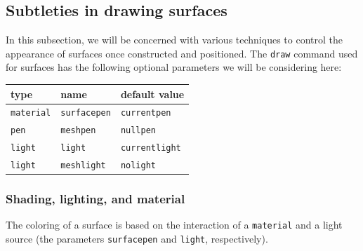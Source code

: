 \documentclass{article}
\begin{document}
\subsection{Subtleties in drawing surfaces}
In this subsection, we will be concerned with various techniques 
to control the appearance of surfaces once 
constructed and positioned.  
The \lstinline!draw! command used for surfaces has the following optional
parameters we will be considering here:
\begin{center}
\begin{tabular}{@{} l l l @{}}						\toprule
type			& name			& default value		\\ \midrule
\lstinline!material! & \lstinline!surfacepen! & \lstinline!currentpen! \\
\lstinline!pen! & \lstinline!meshpen! & \lstinline!nullpen! \\
\lstinline!light! & \lstinline!light! & \lstinline!currentlight! \\
\lstinline!light! & \lstinline!meshlight! & \lstinline!nolight! \\
\bottomrule
\end{tabular}
\end{center}
%
\subsubsection{Shading, lighting, and material}\label{sectionlike:material}
%
The coloring of a surface is based on the interaction of a \lstinline!material! and
a light source (the parameters \lstinline!surfacepen! and \lstinline!light!, respectively).
\end{document}
